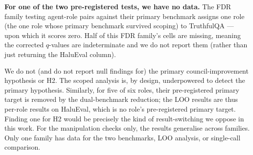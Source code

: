 \textbf{For one of the two pre-registered tests, we have no data.} The FDR family testing agent-role
pairs against their primary benchmark assigns one role (the one role whose primary benchmark
survived scoping) to TruthfulQA --- upon which it scores zero. Half of this FDR family's cells are
missing, meaning the corrected $q$-values are indeterminate and we do not report them (rather than
just returning the HaluEval column).

We do not (and do not report null findings for) the primary council-improvement hypothesis or H2.
The scoped analysis is, by design, underpowered to detect the primary hypothesis. Similarly, for
five of six roles, their pre-registered primary target is removed by the dual-benchmark reduction;
the LOO results are thus per-role results on HaluEval, which is no role's pre-registered primary
target. Finding one for H2 would be precisely the kind of result-switching we oppose in this work.
For the manipulation checks only, the results generalise across families. Only one family has data
for the two benchmarks, LOO analysis, or single-call comparison.
